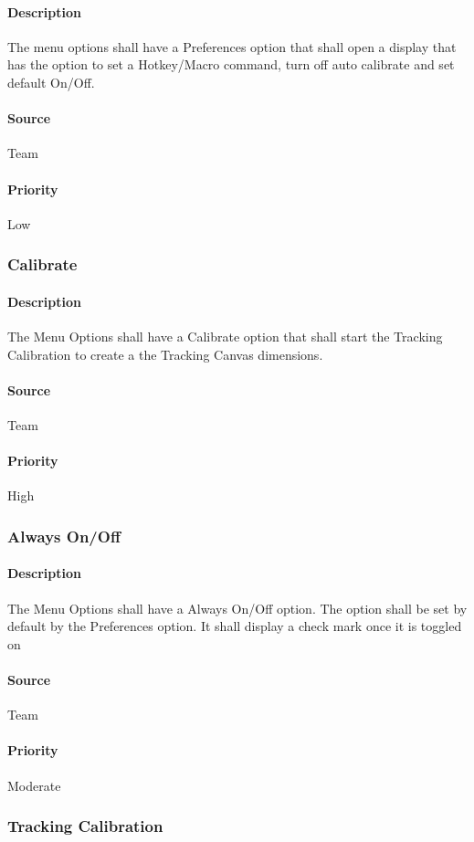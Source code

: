 \paragraph{Description}
The menu options shall have a Preferences option that shall open a display that has the option to set a Hotkey/Macro command, turn off auto calibrate and set default On/Off.
\paragraph{Source}
Team
\paragraph{Priority}
Low
\subsubsection{Calibrate}
\paragraph{Description}
The Menu Options shall have a Calibrate option that shall start the Tracking Calibration to create a the Tracking Canvas dimensions.
\paragraph{Source}
Team
\paragraph{Priority}
High
\subsubsection{Always On/Off}
\paragraph{Description}
The Menu Options shall have a Always On/Off option.  The option shall be set by default by the Preferences option.  It shall display a check mark once it is toggled on
\paragraph{Source}
Team
\paragraph{Priority}
Moderate
\subsubsection{Tracking Calibration}
